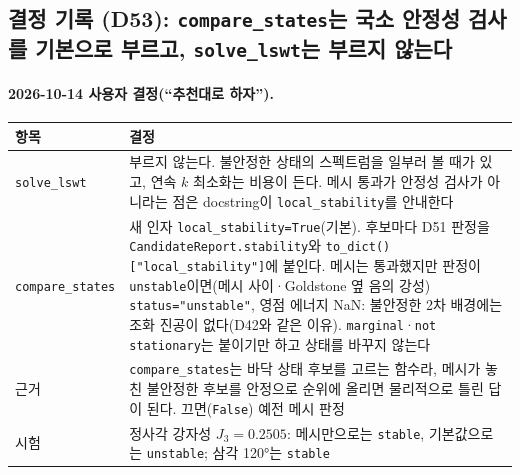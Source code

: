 \subsection{결정 기록 (D53): \texttt{compare\_states}는 국소 안정성 검사를 기본으로 부르고, \texttt{solve\_lswt}는 부르지 않는다}\label{decisions-d53-compare-stability}
\begingroup%
  \framesubtitle{2026-10-14 사용자 결정(``추천대로 하자'').}
  \small\renewcommand{\arraystretch}{1.12}
  \begin{tabularx}{\textwidth}{@{}P{3.0cm}Y@{}}
    \toprule
    항목 & 결정 \\
    \midrule
    \texttt{solve\_lswt} & 부르지 않는다. 불안정한 상태의 스펙트럼을 일부러 볼 때가 있고, 연속 $k$ 최소화는 비용이 든다. 메시 통과가 안정성 검사가 아니라는 점은 docstring이 \texttt{local\_stability}를 안내한다 \\
    \texttt{compare\_states} & 새 인자 \texttt{local\_stability=True}(기본). 후보마다 D51 판정을 \texttt{CandidateReport.stability}와 \texttt{to\_dict()["local\_stability"]}에 붙인다. 메시는 통과했지만 판정이 \texttt{unstable}이면(메시 사이·Goldstone 옆 음의 강성) \texttt{status="unstable"}, 영점 에너지 NaN: 불안정한 2차 배경에는 조화 진공이 없다(D42와 같은 이유). \texttt{marginal}·\texttt{not stationary}는 붙이기만 하고 상태를 바꾸지 않는다 \\
    근거 & \texttt{compare\_states}는 바닥 상태 후보를 고르는 함수라, 메시가 놓친 불안정한 후보를 안정으로 순위에 올리면 물리적으로 틀린 답이 된다. 끄면(\texttt{False}) 예전 메시 판정 \\
    시험 & 정사각 강자성 $J_3=0.2505$: 메시만으로는 \texttt{stable}, 기본값으로는 \texttt{unstable}; 삼각 120°는 \texttt{stable} \\
    \bottomrule
  \end{tabularx}
\endgroup


